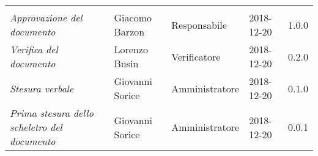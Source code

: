 \newpage 
\section*{}
\begin{table}[H]
	\centering
	\begin{tabular}{p{4cm}|C{3cm}|C{3cm}|R{2.5cm}|R{2cm}}
		
		 & & & & \\
		
		
		\emph{Approvazione del documento} &  Giacomo Barzon & Responsabile & 2018-12-20 & 1.0.0 \\
		\hline
		
		\emph{Verifica del documento} & Lorenzo Busin & Verificatore & 2018-12-20 & 0.2.0 \\
		\hline

		\emph{Stesura verbale} & Giovanni Sorice & Amministratore & 2018-12-20 & 0.1.0 \\
		\hline
		
		\emph{Prima stesura dello scheletro del documento} & Giovanni Sorice & Amministratore & 2018-12-20 & 0.0.1 \\
		
	\end{tabular}
	
\end{table}


\clearpage
